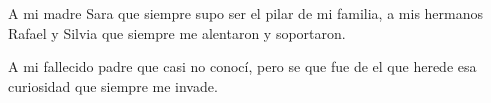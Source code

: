 \vspace*{9cm}
\begin{center}
A mi madre Sara que siempre supo ser el pilar de mi familia, a mis hermanos Rafael y Silvia que siempre me alentaron y soportaron.

A mi fallecido padre que casi no conocí, pero se que fue de el que herede esa curiosidad que siempre me invade.
\end{center}